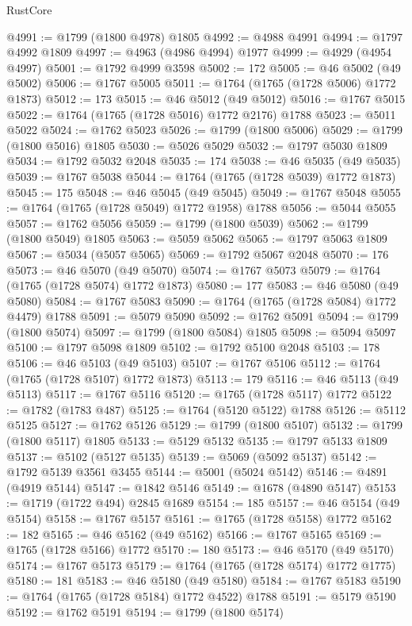 \begin{lexlean}{RustCore}
\begin{coremodule}
@4991 := @1799 (@1800 @4978) @1805
@4992 := @4988 @4991
@4994 := @1797 @4992 @1809
@4997 := @4963 (@4986 @4994) @1977
@4999 := @4929 (@4954 @4997)
@5001 := @1792 @4999 @3598
@5002 := 172
@5005 := @46 @5002 (@49 @5002)
@5006 := @1767 @5005
@5011 := @1764 (@1765 (@1728 @5006) @1772 @1873)
@5012 := 173
@5015 := @46 @5012 (@49 @5012)
@5016 := @1767 @5015
@5022 := @1764 (@1765 (@1728 @5016) @1772 @2176) @1788
@5023 := @5011 @5022
@5024 := @1762 @5023
@5026 := @1799 (@1800 @5006)
@5029 := @1799 (@1800 @5016) @1805
@5030 := @5026 @5029
@5032 := @1797 @5030 @1809
@5034 := @1792 @5032 @2048
@5035 := 174
@5038 := @46 @5035 (@49 @5035)
@5039 := @1767 @5038
@5044 := @1764 (@1765 (@1728 @5039) @1772 @1873)
@5045 := 175
@5048 := @46 @5045 (@49 @5045)
@5049 := @1767 @5048
@5055 := @1764 (@1765 (@1728 @5049) @1772 @1958) @1788
@5056 := @5044 @5055
@5057 := @1762 @5056
@5059 := @1799 (@1800 @5039)
@5062 := @1799 (@1800 @5049) @1805
@5063 := @5059 @5062
@5065 := @1797 @5063 @1809
@5067 := @5034 (@5057 @5065)
@5069 := @1792 @5067 @2048
@5070 := 176
@5073 := @46 @5070 (@49 @5070)
@5074 := @1767 @5073
@5079 := @1764 (@1765 (@1728 @5074) @1772 @1873)
@5080 := 177
@5083 := @46 @5080 (@49 @5080)
@5084 := @1767 @5083
@5090 := @1764 (@1765 (@1728 @5084) @1772 @4479) @1788
@5091 := @5079 @5090
@5092 := @1762 @5091
@5094 := @1799 (@1800 @5074)
@5097 := @1799 (@1800 @5084) @1805
@5098 := @5094 @5097
@5100 := @1797 @5098 @1809
@5102 := @1792 @5100 @2048
@5103 := 178
@5106 := @46 @5103 (@49 @5103)
@5107 := @1767 @5106
@5112 := @1764 (@1765 (@1728 @5107) @1772 @1873)
@5113 := 179
@5116 := @46 @5113 (@49 @5113)
@5117 := @1767 @5116
@5120 := @1765 (@1728 @5117) @1772
@5122 := @1782 (@1783 @487)
@5125 := @1764 (@5120 @5122) @1788
@5126 := @5112 @5125
@5127 := @1762 @5126
@5129 := @1799 (@1800 @5107)
@5132 := @1799 (@1800 @5117) @1805
@5133 := @5129 @5132
@5135 := @1797 @5133 @1809
@5137 := @5102 (@5127 @5135)
@5139 := @5069 (@5092 @5137)
@5142 := @1792 @5139 @3561 @3455
@5144 := @5001 (@5024 @5142)
@5146 := @4891 (@4919 @5144)
@5147 := @1842 @5146
@5149 := @1678 (@4890 @5147)
@5153 := @1719 (@1722 @494) @2845 @1689
@5154 := 185
@5157 := @46 @5154 (@49 @5154)
@5158 := @1767 @5157
@5161 := @1765 (@1728 @5158) @1772
@5162 := 182
@5165 := @46 @5162 (@49 @5162)
@5166 := @1767 @5165
@5169 := @1765 (@1728 @5166) @1772
@5170 := 180
@5173 := @46 @5170 (@49 @5170)
@5174 := @1767 @5173
@5179 := @1764 (@1765 (@1728 @5174) @1772 @1775)
@5180 := 181
@5183 := @46 @5180 (@49 @5180)
@5184 := @1767 @5183
@5190 := @1764 (@1765 (@1728 @5184) @1772 @4522) @1788
@5191 := @5179 @5190
@5192 := @1762 @5191
@5194 := @1799 (@1800 @5174)

\end{coremodule}
\end{lexlean}
